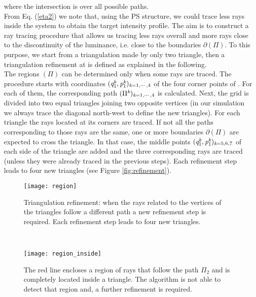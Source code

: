 where the intersection is over all possible paths. \\ \indent
From Eq. (\ref{eta2}) we note that, using the PS structure, we could trace less rays inside the system to obtain the target intensity profile.
The aim is to construct a ray tracing procedure that allows us tracing less rays overall and more rays close to the discontinuity of the luminance, i.e. close to the boundaries $\partial$$(\Pi)$.
To this purpose, we start from a triangulation made by only two triangle, then a triangulation refinement at  is defined as explained in the following. \\ \indent
The regions $(\Pi)$ can be determined only when some rays are traced.
The procedure starts with coordinates $(\textit{q}_1^{\textit{k}},\textit{p}_1^{\textit{k}})_{\textit{k}=1, \cdots, 4}$ of the four corner points of . For each of them, the corresponding path $(\Pi^{\textit{k}})_{\textit{k}=1, \cdots, 4}$ is calculated. Next, the grid is divided into two equal triangles joining two opposite vertices (in our simulation we always trace the diagonal north-west to define the new triangles). For each triangle the rays located at its corners are traced. If not all the paths corresponding to
those rays are the same, one or more boundaries
$\partial$$(\Pi)$ are expected to cross the triangle.
In that case, the middle points $(\textit{q}_1^{\textit{k}},\textit{p}_1^{\textit{k}})_{\textit{k}=5,6,7}$ of each side of the triangle are added and
the three corresponding rays are traced (unless they were already traced in the previous steps). Each refinement step leads to four new triangles (see Figure \ref{fig:refinement}).
 \begin{figure}[h]
 \begin{minipage}[h]{\textwidth}
\centering
    \texttt{[image: region]}
  \caption{Triangulation refinement:
  when the rays related to the vertices of the triangles follow a different path a new refinement step is required.
   Each refinement step leads to four new triangles.}
  \label{fig:refinement}
\end{minipage}\\
\begin{minipage}[h]{\textwidth}
\centering
    \texttt{[image: region\_inside]}
  \caption{The red line encloses a region of rays that follow the path $\Pi_2$ and is completely located inside a triangle.
  The algorithm is not able to detect that region and, a further refinement is required.}
   \label{fig:region inside}
\end{minipage}
  \end{figure} \\ \indent
